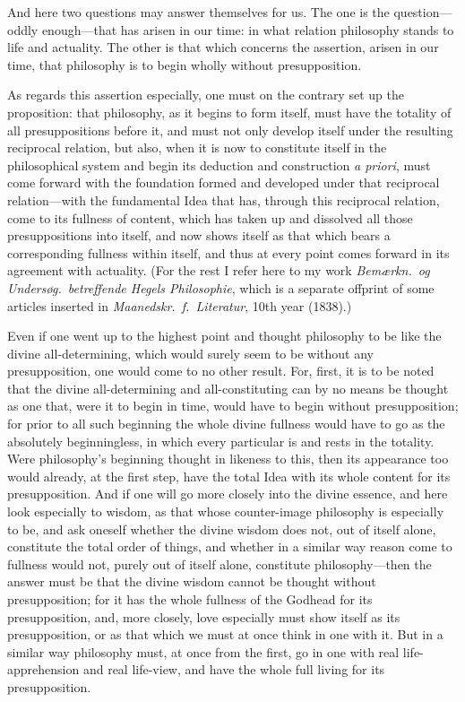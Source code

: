 \documentclass[12pt,a4paper]{book}
\begin{document}
{\small And here two questions may answer themselves for us. The one is the
question---oddly enough---that has arisen in our time: in what relation philosophy
stands to life and actuality. The other is that which concerns the assertion, arisen
in our time, that philosophy is to begin wholly without presupposition.\par}

{\small As regards this assertion especially, one must on the contrary set up the
proposition: that philosophy, as it begins to form itself, must have the totality of
all presuppositions before it, and must not only develop itself under the resulting
reciprocal relation, but also, when it is now to constitute itself in the
philosophical system and begin its deduction and construction \textit{a priori}, must
come forward with the foundation formed and developed under that reciprocal
relation---with the fundamental Idea that has, through this reciprocal relation, come
to its fullness of content, which has taken up and dissolved all those presuppositions
into itself, and now shows itself as that which bears a corresponding fullness within
itself, and thus at every point comes forward in its agreement with actuality. (For
the rest I refer here to my work \textit{Bemærkn.\ og Undersøg.\ betreffende Hegels
Philosophie}, which is a separate offprint of some articles inserted in
\textit{Maanedskr.\ f.\ Literatur}, 10th year (1838).)\par}

{\small Even if one went up to the highest point and thought philosophy to be like
the divine all-determining, which would surely seem to be without any presupposition,
one would come to no other result. For, first, it is to be noted that the divine
all-determining and all-constituting can by no means be thought as one that, were it
to begin in time, would have to begin without presupposition; for prior to all such
beginning the whole divine fullness would have to go as the absolutely beginningless,
in which every particular is and rests in the totality. Were philosophy's beginning
thought in likeness to this, then its appearance too would already, at the first step,
have the total Idea with its whole content for its presupposition. And if one will go
more closely into the divine essence, and here look especially to wisdom, as that
whose counter-image philosophy is especially to be, and ask oneself whether the divine
wisdom does not, out of itself alone, constitute the total order of things, and
whether in a similar way reason come to fullness would not, purely out of itself
alone, constitute philosophy---then the answer must be that the divine wisdom cannot
be thought without presupposition; for it has the whole fullness of the Godhead for
its presupposition, and, more closely, love especially must show itself as its
presupposition, or as that which we must at once think in one with it. But in a
similar way philosophy must, at once from the first, go in one with real
life-apprehension and real life-view, and have the whole full living for its
presupposition.\par}
\end{document}
